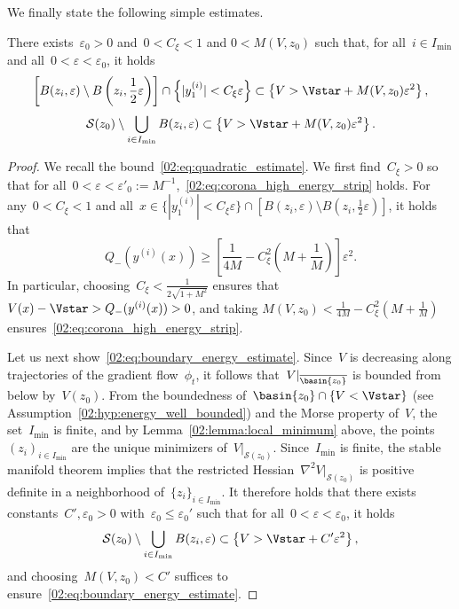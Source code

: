             We finally state the following simple estimates.
            \begin{lemma}
                \label{02:lemma:taylor_saddle}
                There exists~$\varepsilon_0>0$ and~$0<C_\xi<1$ and $0<M(V,z_0)$ such that, for all~$i\in I_{\min}$ and all~$0<\varepsilon<\varepsilon_0$, it holds
                \begin{equation}
                    \label{02:eq:corona_high_energy_strip}
                    \left[B(z_i,\varepsilon)\setminus B\left(z_i,\frac12\varepsilon\right)\right]\cap\left\{|y_1^{(i)}|<C_\xi\varepsilon\right\}\subset\left\{V>\Vstar+M(V,z_0)\varepsilon^2\right\},
                \end{equation}
                \begin{equation}
                    \label{02:eq:boundary_energy_estimate}
                    \mathcal S(z_0)\setminus \bigcup_{i\in I_{\min}}B(z_i,\varepsilon) \subset \left\{V>\Vstar+M(V,z_0)\varepsilon^2\right\}.
                \end{equation}
            \end{lemma}
            \begin{proof}
                We recall the bound~\eqref{02:eq:quadratic_estimate}.
                We first find~$C_\xi >0$ so that for all~$0<\varepsilon<\varepsilon'_0:=M^{-1}$,~\eqref{02:eq:corona_high_energy_strip} holds.
                For any~$0<C_\xi<1$ and all~$x\in \{|y_1^{(i)}|< C_\xi\varepsilon\} \cap \left[B(z_i,\varepsilon)\setminus B\left(z_i,\frac12\varepsilon\right)\right]$, it holds that
                \[Q_{-}(y^{(i)}(x)) \geq \left[\frac1{4M} - C_\xi^2\left(M+\frac1M\right)\right]\varepsilon^2.\]
                In particular, choosing~$C_\xi < \frac1{2\sqrt{1+M^2}}$ ensures that~$V(x)-\Vstar>Q_-(y^{(i)}(x))>0$, and taking $M(V,z_0) <\frac1{4M} - C_\xi^2\left(M+\frac1M\right)$ ensures~\eqref{02:eq:corona_high_energy_strip}.

                Let us next show~\eqref{02:eq:boundary_energy_estimate}. Since~$V$ is decreasing along trajectories of the gradient flow~$\phi_t$, it follows that~$V|_{\overline{\basin{z_0}}}$ is bounded from below by~$V(z_0)$. From the boundedness of~$\basin{z_0}\cap\{V<\Vstar\}$ (see Assumption~\eqref{02:hyp:energy_well_bounded}) and the Morse property of~$V$, the set~$I_{\min}$ is finite, and by Lemma~\ref{02:lemma:local_minimum} above, the points~$(z_i)_{i\in I_{\min}}$ are the unique minimizers of~$V|_{\mathcal S(z_0)}$. Since~$I_{\min}$ is finite, the stable manifold theorem implies that the restricted Hessian~$\nabla^2 V|_{\mathcal S(z_0)}$ is positive definite in a neighborhood of~$\{z_i\}_{i\in I_{\min}}$. It therefore holds that
                there exists constants~$C',\varepsilon_0>0$ with~$\varepsilon_0\leq\varepsilon_0'$ such that for all~$0<\varepsilon<\varepsilon_0$, it holds
                \[\mathcal S(z_0)\setminus \bigcup_{i\in I_{\min}}B(z_i,\varepsilon) \subset \left\{V>\Vstar+C'\varepsilon^2\right\},\]
                and choosing~$M(V,z_0)<C'$ suffices to ensure~\eqref{02:eq:boundary_energy_estimate}.
            \end{proof}
